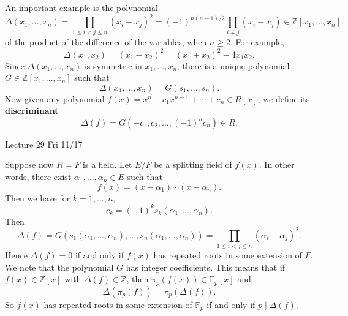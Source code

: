 \documentclass{article}
\def\Z{{\mathbb Z}}
\def\F{{\mathbb F}}
\def\Z{{\mathbb Z}}
\def\F{{\mathbb F}}
\def\C{{\mathbb C}}
\newtheorem{cor}[subsection]{Corollary}
\newenvironment{proof}{\noindent {\bf Proof:}}{$\Box$ \vspace{2 ex}}
\newcommand{\add}[1]{{\color{blue} #1}}
\begin{document}
\vspace{5pt}
An important example is the polynomial
$$\Delta(x_1,\ldots,x_n) = \prod_{1\leq i < j\leq n}(x_i - x_j)^2 = (-1)^{n(n-1)/2}\prod_{i\neq j}(x_i - x_j) \in\Z[x_1,\ldots,x_n].$$%
of the product of the difference of the variables, when $n\geq 2$. For example,
$$\Delta(x_1,x_2) = (x_1 - x_2)^2 = (x_1 + x_2)^2 - 4x_1x_2.$$
Since $\Delta(x_1,\ldots,x_n)$ is symmetric in $x_1,\ldots,x_n$, there is a unique polynomial $G \in \Z[x_1,\ldots,x_n]$ such that $$\Delta(x_1,\ldots,x_n) = G(s_1,\ldots,s_n).$$
Now given any polynomial $f(x) = x^n + c_1x^{n-1} + \cdots + c_n \in R[x]$, we define its \textbf{discriminant}
$$\Delta(f) = G(-c_1, c_2,\ldots,(-1)^nc_n) \in R.$$
\begin{center}
    \add{Lecture 29 Fri 11/17}
\end{center}
Suppose now $R = F$ is a field. Let $E/F$ be a splitting field of $f(x)$. In other words, there exist $\alpha_1,\ldots,\alpha_n\in E$ such that $$f(x) = (x - \alpha_1)\cdots (x - \alpha_n).$$
Then we have for $k = 1,\ldots,n$, $$c_k = (-1)^ks_k(\alpha_1,\ldots,\alpha_n).$$
Then
$$\Delta(f) = G(s_1(\alpha_1,\ldots,\alpha_n),\ldots,s_n(\alpha_1,\ldots,\alpha_n)) = \prod_{1\leq i < j\leq n}(\alpha_i - \alpha_j)^2.$$
Hence $\Delta(f) = 0$ if and only if $f(x)$ has repeated roots in some extension of $F$. We note that the polynomial $G$ has integer coefficients. This means that if $f(x)\in\Z[x]$ with $\Delta(f)\in\Z$, then $\pi_p(f(x))\in\F_p[x]$ and $$\Delta(\pi_p(f)) = \pi_p(\Delta(f)).$$
So $f(x)$ has repeated roots in some extension of $\F_p$ if and only if $p\mid \Delta(f)$.

\begin{comment}
\begin{cor}
    Suppose $f(x)\in R[x]$ is a monic polynomial over a commutative ring $R$. Let $F$ be any field and let $\pi:R\rightarrow F$ be a homomorphism. Then $\pi(f)\in F[x]$ has repeated roots in some extension of $F$ if and only if $\pi(\Delta(f)) = 0$. 
\end{cor}

\begin{proof}
    The key observation here is that the defining polynomial $G$ has coefficients in $\Z$, so that it is ``fixed'' by any ring homomorphism. It is then easy to check that $\Delta(\pi(f)) = \pi(\Delta(f))$ in $F$.
\end{proof}
\end{comment}

\end{document}

